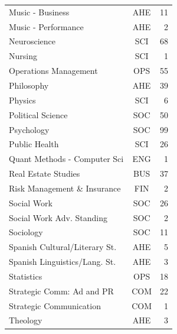 \documentclass[
  11pt,
  letterpaper,
]{report}
\begin{document}
\begin{longtable}[]{@{}lcr@{}}
Music - Business & AHE & 11 \\
Music - Performance & AHE & 2 \\
Neuroscience & SCI & 68 \\
Nursing & SCI & 1 \\
Operations Management & OPS & 55 \\
Philosophy & AHE & 39 \\
Physics & SCI & 6 \\
Political Science & SOC & 50 \\
Psychology & SOC & 99 \\
Public Health & SCI & 26 \\
Quant Methods - Computer Sci & ENG & 1 \\
Real Estate Studies & BUS & 37 \\
Risk Management \& Insurance & FIN & 2 \\
Social Work & SOC & 26 \\
Social Work Adv. Standing & SOC & 2 \\
Sociology & SOC & 11 \\
Spanish Cultural/Literary St. & AHE & 5 \\
Spanish Linguistics/Lang. St. & AHE & 3 \\
Statistics & OPS & 18 \\
Strategic Comm: Ad and PR & COM & 22 \\
Strategic Communication & COM & 1 \\
Theology & AHE & 3 \\
\end{longtable}
\end{document}
